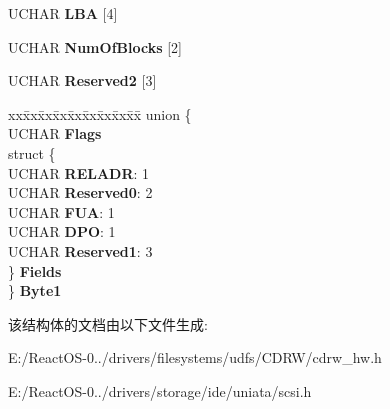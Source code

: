 \begin{DoxyCompactItemize}
\begin{tabbing}
\end{tabbing}\item 
\mbox{\label{struct___c_d_b_1_1___w_r_i_t_e___c_d_a7425ab79eadaaabf424555d6b7b36c22}} 
U\+C\+H\+AR {\bfseries L\+BA} \mbox{[}4\mbox{]}
\item 
\mbox{\label{struct___c_d_b_1_1___w_r_i_t_e___c_d_ab166a310d8efb3bff989b18bf8f38561}} 
U\+C\+H\+AR {\bfseries Num\+Of\+Blocks} \mbox{[}2\mbox{]}
\item 
\mbox{\label{struct___c_d_b_1_1___w_r_i_t_e___c_d_a07fe97b7a0330c396f820982c50d2ccd}} 
U\+C\+H\+AR {\bfseries Reserved2} \mbox{[}3\mbox{]}
\item 
\mbox{\label{struct___c_d_b_1_1___w_r_i_t_e___c_d_a1b1a24f21fab80ecf3a66b416b99ad43}} 
\begin{tabbing}
xx\=xx\=xx\=xx\=xx\=xx\=xx\=xx\=xx\=\kill
union \{\\
\>UCHAR {\bfseries Flags}\\
\>struct \{\\
\>\>UCHAR {\bfseries RELADR}: 1\\
\>\>UCHAR {\bfseries Reserved0}: 2\\
\>\>UCHAR {\bfseries FUA}: 1\\
\>\>UCHAR {\bfseries DPO}: 1\\
\>\>UCHAR {\bfseries Reserved1}: 3\\
\>\} {\bfseries Fields}\\
\} {\bfseries Byte1}\\

\end{tabbing}\end{DoxyCompactItemize}


该结构体的文档由以下文件生成\+:\begin{DoxyCompactItemize}
\item 
E\+:/\+React\+O\+S-\/0../drivers/filesystems/udfs/\+C\+D\+R\+W/cdrw\+\_\+hw.\+h\item 
E\+:/\+React\+O\+S-\/0../drivers/storage/ide/uniata/scsi.\+h\end{DoxyCompactItemize}
